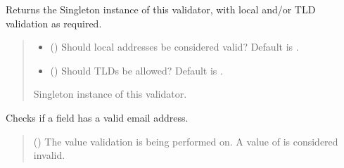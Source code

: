 \documentclass[letterpaper,10pt,english]{sphinxmanual}
\begin{document}
\begin{fulllineitems}
\begin{fulllineitems}
\label{\detokenize{apache_commons_validator_python.routines:apache_commons_validator_python.routines.email_validator.EmailValidator.get_instance}}
\pysigstartsignatures
{}
\pysigstopsignatures
\sphinxAtStartPar
Returns the Singleton instance of this validator, with local and/or TLD
validation as required.
\begin{quote}\begin{description}
\begin{itemize}
\item {} 
\sphinxAtStartPar
{} () \textendash{} Should local addresses be considered valid?
Default is .

\item {} 
\sphinxAtStartPar
{} () \textendash{} Should TLDs be allowed? Default is .

\end{itemize}

\sphinxAtStartPar
Singleton instance of this validator.

\end{description}\end{quote}

\end{fulllineitems}


\begin{fulllineitems}
\label{\detokenize{apache_commons_validator_python.routines:apache_commons_validator_python.routines.email_validator.EmailValidator.is_valid}}
\pysigstartsignatures
{}
\pysigstopsignatures
\sphinxAtStartPar
Checks if a field has a valid e\sphinxhyphen{}mail address.
\begin{quote}\begin{description}
\sphinxAtStartPar
{} () \textendash{} The value validation is being performed on. A value of 
is considered invalid.


\end{description}
\end{quote}
\end{fulllineitems}
\end{fulllineitems}
\end{document}
